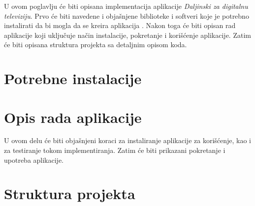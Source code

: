 \documentclass[../TamaraIvanovicMasterRad.tex]{subfiles}
\begin{document}
U ovom poglavlju će biti opisana implementacija aplikacije \textit{Daljinski za digitalnu televiziju}. Prvo će biti navedene i objašnjene biblioteke i softveri koje je potrebno instalirati da bi mogla da se kreira aplikacija . Nakon toga će biti opisan rad aplikacije koji uključuje način instalacije, pokretanje i korišćenje aplikacije. Zatim će biti opisana struktura projekta sa detaljnim opisom koda.

\section{Potrebne instalacije} \label{opis_rada}

\section{Opis rada aplikacije} 
U ovom delu će biti objašnjeni koraci za instaliranje aplikacije za korišćenje, kao i za testiranje tokom implementiranja. Zatim će biti prikazani pokretanje i upotreba aplikacije. 





\section{Struktura projekta}


\end{document}
